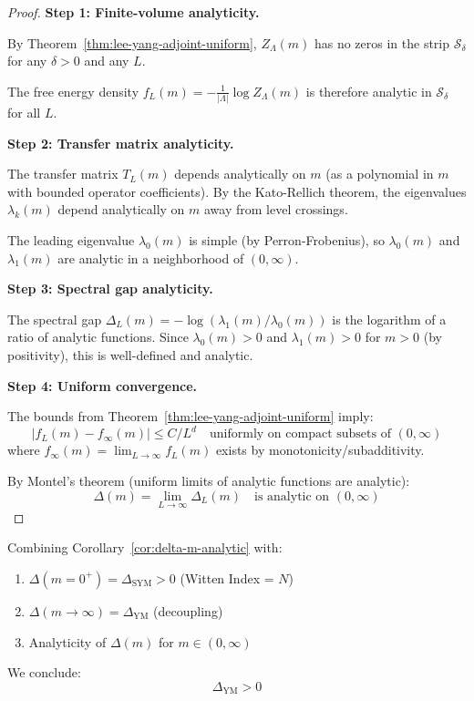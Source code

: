 \begin{proof}
\textbf{Step 1: Finite-volume analyticity.}

By Theorem~\ref{thm:lee-yang-adjoint-uniform}, $Z_\Lambda(m)$ has no zeros in the 
strip $\mathcal{S}_\delta$ for any $\delta > 0$ and any $L$.

The free energy density $f_L(m) = -\frac{1}{|\Lambda|} \log Z_\Lambda(m)$ is therefore 
analytic in $\mathcal{S}_\delta$ for all $L$.

\textbf{Step 2: Transfer matrix analyticity.}

The transfer matrix $T_L(m)$ depends analytically on $m$ (as a polynomial in $m$ 
with bounded operator coefficients). By the Kato-Rellich theorem, the eigenvalues 
$\lambda_k(m)$ depend analytically on $m$ away from level crossings.

The leading eigenvalue $\lambda_0(m)$ is simple (by Perron-Frobenius), so 
$\lambda_0(m)$ and $\lambda_1(m)$ are analytic in a neighborhood of $(0, \infty)$.

\textbf{Step 3: Spectral gap analyticity.}

The spectral gap $\Delta_L(m) = -\log(\lambda_1(m)/\lambda_0(m))$ is the logarithm 
of a ratio of analytic functions. Since $\lambda_0(m) > 0$ and $\lambda_1(m) > 0$ 
for $m > 0$ (by positivity), this is well-defined and analytic.

\textbf{Step 4: Uniform convergence.}

The bounds from Theorem~\ref{thm:lee-yang-adjoint-uniform} imply:
\[
|f_L(m) - f_\infty(m)| \leq C/L^d \quad \text{uniformly on compact subsets of } (0, \infty)
\]
where $f_\infty(m) = \lim_{L \to \infty} f_L(m)$ exists by monotonicity/subadditivity.

By Montel's theorem (uniform limits of analytic functions are analytic):
\[
\Delta(m) = \lim_{L \to \infty} \Delta_L(m) \quad \text{is analytic on } (0, \infty)
\]
\end{proof}

\begin{theorem}
\label{thm:adjoint-complete}
Combining Corollary~\ref{cor:delta-m-analytic} with:
\begin{enumerate}
\item $\Delta(m=0^+) = \Delta_{\mathrm{SYM}} > 0$ (Witten Index = $N$)
\item $\Delta(m \to \infty) = \Delta_{\mathrm{YM}}$ (decoupling)
\item Analyticity of $\Delta(m)$ for $m \in (0, \infty)$
\end{enumerate}

We conclude:
\[
\boxed{\Delta_{\mathrm{YM}} > 0}
\]
\end{theorem}


